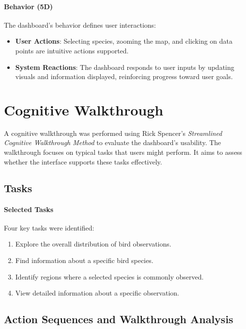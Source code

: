 \paragraph{Behavior (5D)}

The dashboard's behavior defines user interactions:

\begin{itemize} 
    \item \textbf{User Actions}: Selecting species, zooming the map, and clicking on data points are intuitive actions supported. 
    \item \textbf{System Reactions}: The dashboard responds to user inputs by updating visuals and information displayed, reinforcing progress toward user goals. 
\end{itemize}

\section{Cognitive Walkthrough}

A cognitive walkthrough was performed using Rick Spencer's \textit{Streamlined Cognitive Walkthrough Method} \cite{spencerStreamlinedCognitiveWalkthrough2000} to evaluate the dashboard's usability. The walkthrough focuses on typical tasks that users might perform. It aims to assess whether the interface supports these tasks effectively.

\subsection{Tasks}

\paragraph{Selected Tasks}

Four key tasks were identified:

\begin{enumerate} 
    \item Explore the overall distribution of bird observations. 
    \item Find information about a specific bird species. 
    \item Identify regions where a selected species is commonly observed. 
    \item View detailed information about a specific observation. 
\end{enumerate}

\subsection{Action Sequences and Walkthrough Analysis}


